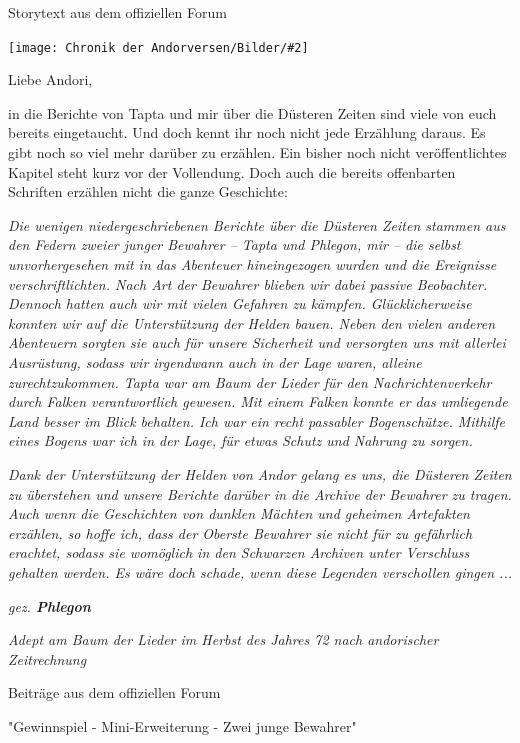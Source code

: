 \documentclass[10pt, a4paper, oneside]{book}
\newcommand{\bildmitts}[2][height=0.32\textwidth,width=0.48\textwidth,keepaspectratio]{%
    \begin{center}
        \texttt{[image: Chronik der Andorversen/Bilder/\#2]}
    \end{center}
}
\begin{document}
\begin{multicols}{2}
\begin{center}
    Storytext aus dem offiziellen Forum
\end{center}

\bildmitts{Zwei junge Bewahrer (2020).jpg}

Liebe Andori,

in die Berichte von Tapta und mir über die Düsteren Zeiten sind viele von euch bereits eingetaucht. Und doch kennt ihr noch nicht jede Erzählung daraus. Es gibt noch so viel mehr darüber zu erzählen. Ein bisher noch nicht veröffentlichtes Kapitel steht kurz vor der Vollendung. Doch auch die bereits offenbarten Schriften erzählen nicht die ganze Geschichte:\bigskip

\textit{Die wenigen niedergeschriebenen Berichte über die Düsteren Zeiten stammen aus den Federn zweier junger Bewahrer – Tapta und Phlegon, mir – die selbst unvorhergesehen mit in das Abenteuer hineingezogen wurden und die Ereignisse verschriftlichten. Nach Art der Bewahrer blieben wir dabei passive Beobachter. Dennoch hatten auch wir mit vielen Gefahren zu kämpfen. Glücklicherweise konnten wir auf die Unterstützung der Helden bauen. Neben den vielen anderen Abenteuern sorgten sie auch für unsere Sicherheit und versorgten uns mit allerlei Ausrüstung, sodass wir irgendwann auch in der Lage waren, alleine zurechtzukommen. Tapta war am Baum der Lieder für den Nachrichtenverkehr durch Falken verantwortlich gewesen. Mit einem Falken konnte er das umliegende Land besser im Blick behalten. Ich war ein recht passabler Bogenschütze. Mithilfe eines Bogens war ich in der Lage, für etwas Schutz und Nahrung zu sorgen.}

\textit{Dank der Unterstützung der Helden von Andor gelang es uns, die Düsteren Zeiten zu überstehen und unsere Berichte darüber in die Archive der Bewahrer zu tragen. Auch wenn die Geschichten von dunklen Mächten und geheimen Artefakten erzählen, so hoffe ich, dass der Oberste Bewahrer sie nicht für zu gefährlich erachtet, sodass sie womöglich in den Schwarzen Archiven unter Verschluss gehalten werden. Es wäre doch schade, wenn diese Legenden verschollen gingen ...}\bigskip

\textit{gez. \textbf{Phlegon}}

\textit{Adept am Baum der Lieder im Herbst des Jahres 72 nach andorischer Zeitrechnung}



\begin{center}
    Beiträge aus dem offiziellen Forum

    "Gewinnspiel - Mini-Erweiterung - Zwei junge Bewahrer"
\end{center}


\end{multicols}
\end{document}
